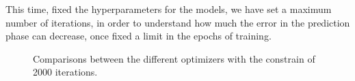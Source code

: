         This time, fixed the hyperparameters for the models, we have set a maximum number of iterations, in order to understand how much the error in the prediction phase can decrease, once fixed a limit in the epochs of training.


            \begin{figure}[t!]{}
                \centering
                \begin{subfigure}{0.45\textwidth}
                    \caption{}
                    \label{fig:cup_MSE_all_t}
                \end{subfigure}
                \begin{subfigure}{0.45\textwidth}
                    \caption{}
                    \label{fig:cup_MSE_all}
                \end{subfigure}
                \caption{Comparisons between the different optimizers with the constrain of 2000 iterations.}
                \label{fig:cup_MSE_all}
            \end{figure}

